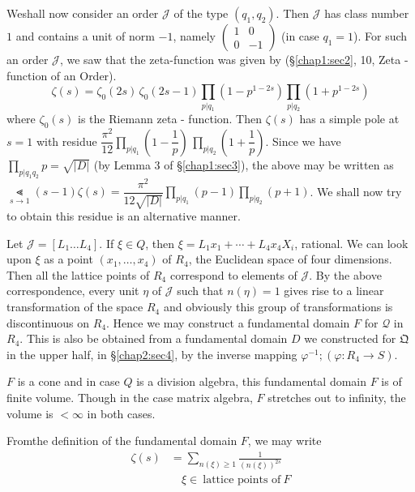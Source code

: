 We\pageoriginale shall now consider an order $\mathcal{J}$ of the type $(q_1,
q_2)$. Then $\mathcal{J}$ has class number $1$ and contains a unit of
norm $-1$, namely $\begin{pmatrix} 1 & 0 \\ 0 & -1 \end{pmatrix}$ (in
case $q_1=1$). For
such an order $\mathcal{J}$, we saw that the zeta-function was given
by (\S \ref{chap1:sec2},  10, Zeta -function of an Order).  
$$
 \zeta (s) = \zeta_0 (2s)\, \zeta_0 (2s-1) \prod_{ p | q_1} (1 - p ^{ 1
   -2s}) \prod_{ p | q_2} (1 + p^ { 1 - 2s}) 
$$
where $\zeta_0(s)$ is the Riemann zeta - function. Then $\zeta(s)$ has
a simple pole at $s = 1$ with residue $ \dfrac{\pi^2}{12} \prod_{ p |
  q_1} \left( 1- \dfrac{1}{p}\right) \, \prod_{ p | q_2}\left(1+
\dfrac{1}{p} \right)$. Since we
have $\prod_{ p | q_1q_2} p = \sqrt{ |D|}$ (by
Lemma \label{chap2:sec5:lem3}$3$ of \S \ref{chap1:sec3}), 
the above may be written as $\Lt\limits_{ s \to 1}(s - 1 ) \zeta (s) =
\dfrac{\pi^2}{12\sqrt{|D|}} \prod\limits_{ p | q_1}(p-1)
\prod\limits_{ p | q_2}(p+1)$. We shall now try to obtain this residue
is an alternative manner.  

Let $\mathcal{J} = [ L_1 \ldots L_4]$. If $\xi \in Q$, then $\xi = L_1
x_1 + \cdots + L_4 x_4 X_i$, rational. We can look upon $\xi$ as a
point $(x_1,  \ldots,  x_4)$ of $R_4$, the Euclidean space of four
dimensions. Then all the lattice points of $R_4$ correspond to elements
of $\mathcal{J}$. By the above correspondence, every unit $\eta$ of
$\mathcal{J}$ such that $n(\eta) = 1$ gives rise to a linear
transformation of the space $R_4$ and obviously this group of
transformations is discontinuous on $R_4$. Hence we may construct a
fundamental domain $F$ for $\mathcal{Q}$ in $R_4$. This is also be
obtained from a fundamental domain $D$ we constructed for
$\mathfrak{Q}$ in the upper half, in \S \ref{chap2:sec4}, by the inverse mapping
$\varphi^{-1} ; ( \varphi : R_4 \to S)$. 

$F$ is a cone and in case $Q$ is
a division algebra, this fundamental domain $F$ is of finite
volume. Though in the case matrix algebra, $F$ stretches out to
infinity, the volume is $< \infty$ in both cases. 

From\pageoriginale the definition of the fundamental domain $F$, we may write 
\begin{align*}
  \zeta(s) & = \sum_{ n (\xi) \geq 1} \frac{1}{(n(\xi))^{2s}}\\
  & \quad \xi \in  ~\text{lattice points of}~ F
\end{align*}

